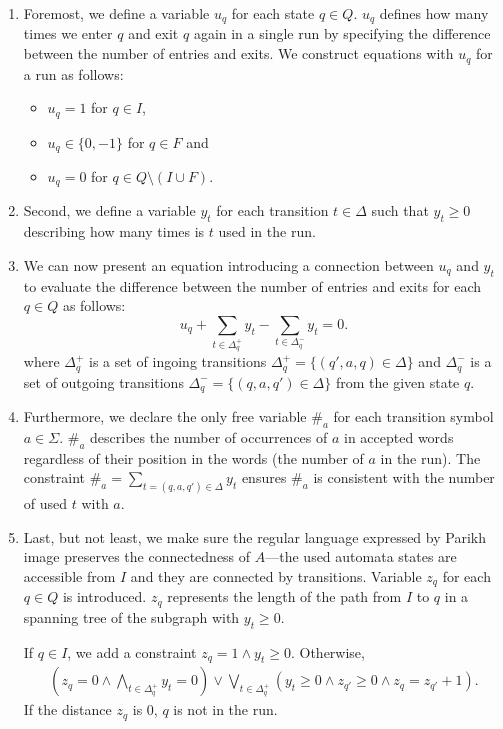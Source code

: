 \begin{enumerate}
    \item \label{clauses:u_original} Foremost, we define a variable $u_{q}$ for each state $q \in Q$. $u_{q}$ defines how many times we enter $q$ and exit $q$ again in a single run by specifying the difference between the number of entries and exits. We construct equations with $u_{q}$ for a run as follows:
    \begin{itemize}
        \item $u_{q} = 1$ for $q \in I$,
        \item $u_{q} \in \{ 0, -1 \}$ for $q \in F$ and
        \item $u_{q} = 0$ for $q \in Q \setminus ( I \cup F )$.
    \end{itemize}

    \item \label{clauses:y_original} Second, we define a variable $y_{t}$ for each transition $t \in \Delta$ such that $y_{t} \geq 0$ describing how many times is $t$ used in the run.

    \item \label{clauses:uy_original} We can now present an equation introducing a connection between $u_{q}$ and $y_{t}$ to evaluate the difference between the number of entries and exits for each $q \in Q$ as follows:
    $$ u_q + \sum_{t \in \Delta_q^+} y_t - \sum_{t \in \Delta_q^-} y_t = 0.$$
    where $\Delta_q^+$ is a set of ingoing transitions $ \Delta_q^+ = \{ (q',a,q) \in \Delta \}$ and $\Delta_q^-$ is a set of outgoing transitions $ \Delta_q^- = \{ (q,a,q') \in \Delta \} $ from the given state $q$.

    \item \label{clauses:hash_original} Furthermore, we declare the only free variable $\#_a$ for each transition symbol $ a \in \Sigma$. $\#_a$ describes the number of occurrences of $a$ in accepted words regardless of their position in the words (the number of $a$ in the run). The constraint $\#_a = \sum_{t = (q, a, q') \in \Delta} y_t$ ensures $\#_a$ is consistent with the number of used $t$ with $a$.

    \item \label{clauses:z_original} Last, but not least, we make sure the regular language expressed by Parikh image preserves the connectedness of $A$---the used automata states are accessible from $I$ and they are connected by transitions. Variable $z_q$ for each $q \in Q$ is introduced. $z_q$ represents the length of the path from $I$ to $q$ in a spanning tree of the subgraph with $y_t \geq 0$.

    If $q \in I$, we add a constraint $z_q = 1 \land y_t \geq 0$. Otherwise,
    {
    \begin{align*}
        (z_q = 0 \land \bigwedge_{t \in \Delta_q^+} y_t = 0) \lor \bigvee_{t \in \Delta_q^+} (y_t \geq 0 \land z_{q'} \geq 0 \land z_q = z_{q'} + 1) \text{.}
    \end{align*}
    }
    If the distance $z_q$ is $0$, $q$ is not in the run.
\end{enumerate}

